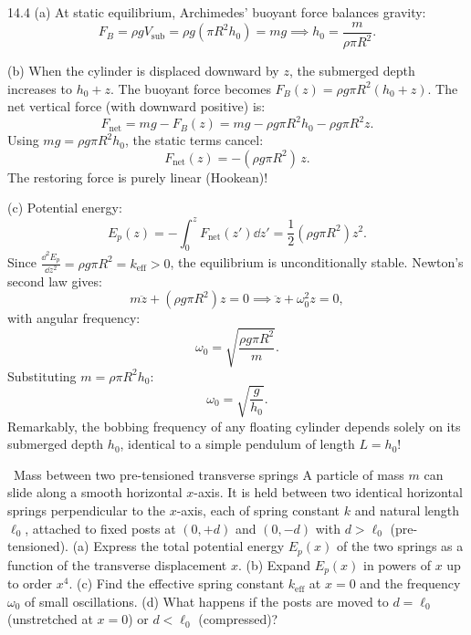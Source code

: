 \begin{tabletworkspace}[5.5cm]
\end{tabletworkspace}

\begin{solution}{14.4}
(a) At static equilibrium, Archimedes' buoyant force balances gravity:
\[
F_B = \rho g V_{\text{sub}} = \rho g (\pi R^2 h_0) = mg \implies \boxed{h_0 = \frac{m}{\rho \pi R^2}.}
\]

(b) When the cylinder is displaced downward by $z$, the submerged depth increases to $h_0 + z$.
The buoyant force becomes $F_B(z) = \rho g \pi R^2(h_0 + z)$.
The net vertical force (with downward positive) is:
\[
F_{\text{net}} = mg - F_B(z) = mg - \rho g \pi R^2 h_0 - \rho g \pi R^2 z.
\]
Using $mg = \rho g \pi R^2 h_0$, the static terms cancel:
\[
\boxed{F_{\text{net}}(z) = -(\rho g \pi R^2)\,z.}
\]
The restoring force is purely linear (Hookean)!

(c) Potential energy:
\[
E_p(z) = -\int_0^z F_{\text{net}}(z')\dd z' = \frac{1}{2}(\rho g \pi R^2)z^2.
\]
Since $\frac{\dd^2 E_p}{\dd z^2} = \rho g \pi R^2 = k_{\text{eff}} > 0$, the equilibrium is unconditionally stable.
Newton's second law gives:
\[
m\ddot{z} + (\rho g \pi R^2)z = 0 \implies \ddot{z} + \omega_0^2 z = 0,
\]
with angular frequency:
\[
\omega_0 = \sqrt{\frac{\rho g \pi R^2}{m}}.
\]
Substituting $m = \rho \pi R^2 h_0$:
\[
\boxed{\omega_0 = \sqrt{\frac{g}{h_0}}.}
\]
Remarkably, the bobbing frequency of any floating cylinder depends solely on its submerged depth $h_0$, identical to a simple pendulum of length $L = h_0$!
\end{solution}

\begin{exercise}{\mastery\ Mass between two pre-tensioned transverse springs}
A particle of mass $m$ can slide along a smooth horizontal $x$-axis. It is held between two identical horizontal springs perpendicular to the $x$-axis, each of spring constant $k$ and natural length $\ell_0$, attached to fixed posts at $(0, +d)$ and $(0, -d)$ with $d > \ell_0$ (pre-tensioned).
(a) Express the total potential energy $E_p(x)$ of the two springs as a function of the transverse displacement $x$.
(b) Expand $E_p(x)$ in powers of $x$ up to order $x^4$.
(c) Find the effective spring constant $k_{\text{eff}}$ at $x = 0$ and the frequency $\omega_0$ of small oscillations.
(d) What happens if the posts are moved to $d = \ell_0$ (unstretched at $x=0$) or $d < \ell_0$ (compressed)?
\end{exercise}

\begin{tabletworkspace}[6.5cm]
\end{tabletworkspace}

